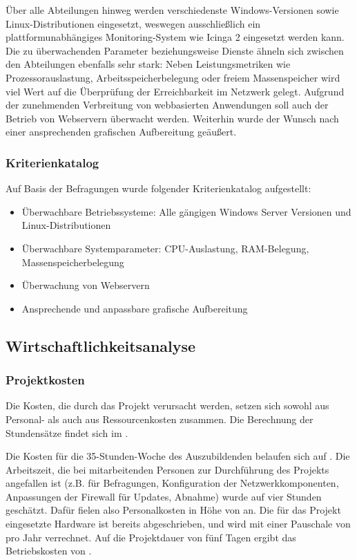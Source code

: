 Über alle Abteilungen hinweg werden verschiedenste Windows-Versionen sowie Linux-Distributionen eingesetzt, weswegen ausschließlich ein plattformunabhängiges Monitoring-System wie \glqq Icinga 2\grqq{} eingesetzt werden kann. Die zu überwachenden Parameter beziehungsweise Dienste ähneln sich zwischen den Abteilungen ebenfalls sehr stark: Neben Leistungsmetriken wie Prozessorauslastung, Arbeitsspeicherbelegung oder freiem Massenspeicher wird viel Wert auf die Überprüfung der Erreichbarkeit im Netzwerk gelegt. Aufgrund der zunehmenden Verbreitung von webbasierten Anwendungen soll auch der Betrieb von Webservern überwacht werden. Weiterhin wurde der Wunsch nach einer ansprechenden grafischen Aufbereitung geäußert.

\subsubsection{Kriterienkatalog}
\label{sec:Kriterienkatalog}
Auf Basis der Befragungen wurde folgender Kriterienkatalog aufgestellt:
\begin{itemize}
	\item Überwachbare Betriebssysteme: Alle gängigen Windows Server Versionen und Linux-Distributionen
	\item Überwachbare Systemparameter: CPU-Auslastung, RAM-Belegung, Massenspeicherbelegung
	\item Überwachung von Webservern
	\item Ansprechende und anpassbare grafische Aufbereitung
\end{itemize}

\subsection{Wirtschaftlichkeitsanalyse}
\label{sec:Wirtschaftlichkeitsanalyse}

\subsubsection{Projektkosten}
\label{sec:Projektkosten}
Die Kosten, die durch das Projekt verursacht werden, setzen sich sowohl aus Personal- als auch aus Ressourcenkosten zusammen. Die Berechnung der Stundensätze findet sich im .

Die Kosten für die 35-Stunden-Woche des Auszubildenden belaufen sich auf . Die Arbeitszeit, die bei mitarbeitenden Personen zur Durchführung des Projekts angefallen ist (z.B. für Befragungen, Konfiguration der Netzwerkkomponenten, Anpassungen der Firewall für Updates, Abnahme) wurde auf vier Stunden geschätzt. Dafür fielen also Personalkosten in Höhe von  an. Die für das Projekt eingesetzte Hardware ist bereits abgeschrieben, und wird mit einer Pauschale von  pro Jahr verrechnet. Auf die Projektdauer von fünf Tagen ergibt das Betriebskosten von .


